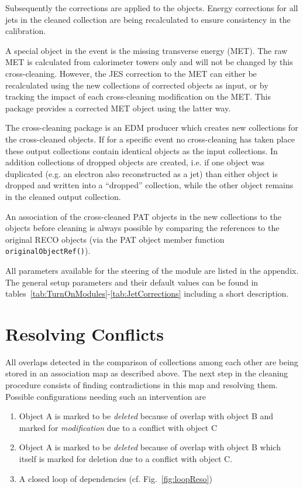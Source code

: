 \documentclass{cmspaper}
\begin{document}
Subsequently the corrections are applied to the objects. Energy corrections for
all jets in the cleaned collection are being recalculated to ensure consistency
in the calibration.

A special object in the event is the missing transverse energy (MET). The raw
MET is calculated from calorimeter towers only and will not be changed by this
cross-cleaning. However, the JES correction to the MET can either be
recalculated using the new collections of corrected objects as input, or by
tracking the impact of each cross-cleaning modification on the MET. This
package provides a corrected MET object using the latter way.

The cross-cleaning package is an EDM producer which creates new collections for
the cross-cleaned objects. If for a specific event no cross-cleaning has taken
place these output collections contain identical objects as the input
collections.  In addition collections of dropped objects are created, i.e. if
one object was duplicated (e.g. an electron also reconstructed as a jet) than
either object is dropped and written into a ``dropped'' collection, while the
other object remains in the cleaned output collection.

An association of the cross-cleaned PAT objects in the new collections to the
objects before cleaning is always possible by comparing the references to the
original RECO objects (via the PAT object member function
\\\texttt{originalObjectRef()}). 

All parameters available for the steering of the module are listed in the
appendix. The general setup parameters and their default values can be found in
tables~\ref{tab:TurnOnModules}-\ref{tab:JetCorrections} including a short
description.

\section{Resolving Conflicts}
\label{mapReso}
All overlaps detected in the comparison of collections among each other are
being stored in an association map as described above. The next step in the
cleaning procedure consists of finding contradictions in this map and resolving
them.  Possible configurations needing such an intervention are
\begin{enumerate}
    \item Object A is marked to be \textit{deleted} because of overlap with
	object B and marked for \textit{modification} due to a conflict with
	object C
    \item Object A is marked to be \textit{deleted} because of overlap with
	object B which itself is marked for deletion due to a conflict with
	object C.
    \item A closed loop of dependencies (cf. Fig.~\ref{fig:loopReso})
\end{enumerate}
\end{document}
